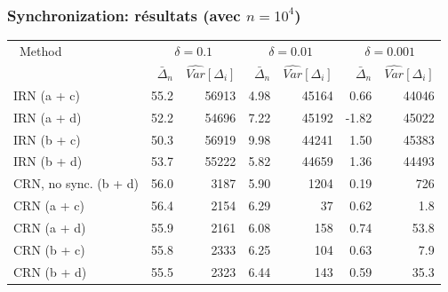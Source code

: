 \documentclass[t,usepdftitle=false]{beamer}
\begin{document}
\begin{frame}
	\frametitle{Synchronization: résultats (avec ${n=10^4}$)}
	
	\begin{footnotesize}
		\begin{center}
			\begin{tabular}{|l|rr|rr|rr|}
				\hline
				\ Method
				& \multicolumn{2}{|c}{$\delta = 0.1$}
				& \multicolumn{2}{|c}{$\delta = 0.01$}
				& \multicolumn{2}{|c|}{$\delta = 0.001$} \\
				& $\bar \Delta_n$ & $\widehat{Var}[\Delta_i]$
				& $\bar \Delta_n$ & $\widehat{Var}[\Delta_i]$
				& $\bar \Delta_n$ & $\widehat{Var}[\Delta_i]$\\
				\hline
				IRN (a + c)                      &  55.2 & 56913 &  4.98 & 45164 &  0.66 & 44046 \\
				IRN (a + d)                      &  52.2 & 54696 &  7.22 & 45192 & -1.82 & 45022 \\
				IRN (b + c)                      &  50.3 & 56919 &  9.98 & 44241 &  1.50 & 45383 \\
				IRN (b + d)                      &  53.7 & 55222 &  5.82 & 44659 &  1.36 & 44493 \\
				CRN, no sync. (b + d)            &  56.0 &  3187 &  5.90 &  1204 &  0.19 &   726 \\
				CRN (a + c)                      &  56.4 &  2154 &  6.29 &    37 &  0.62 &   1.8 \\
				CRN (a + d)                      &  55.9 &  2161 &  6.08 &   158 &  0.74 &  53.8 \\
				CRN (b + c)                      &  55.8 &  2333 &  6.25 &   104 &  0.63 &   7.9 \\
				CRN (b + d)                      &  55.5 &  2323 &  6.44 &   143 &  0.59 &  35.3 \\
				\hline
			\end{tabular}
		\end{center}
	\end{footnotesize}
	
\end{frame}
\end{document}
